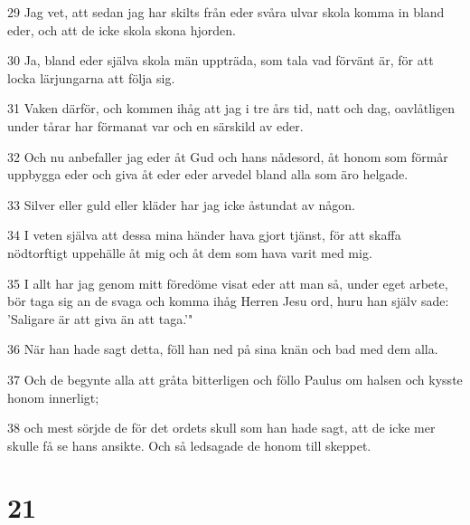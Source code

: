 \par 29 Jag vet, att sedan jag har skilts från eder svåra ulvar skola komma in bland eder, och att de icke skola skona hjorden.
\par 30 Ja, bland eder själva skola män uppträda, som tala vad förvänt är, för att locka lärjungarna att följa sig.
\par 31 Vaken därför, och kommen ihåg att jag i tre års tid, natt och dag, oavlåtligen under tårar har förmanat var och en särskild av eder.
\par 32 Och nu anbefaller jag eder åt Gud och hans nådesord, åt honom som förmår uppbygga eder och giva åt eder eder arvedel bland alla som äro helgade.
\par 33 Silver eller guld eller kläder har jag icke åstundat av någon.
\par 34 I veten själva att dessa mina händer hava gjort tjänst, för att skaffa nödtorftigt uppehälle åt mig och åt dem som hava varit med mig.
\par 35 I allt har jag genom mitt föredöme visat eder att man så, under eget arbete, bör taga sig an de svaga och komma ihåg Herren Jesu ord, huru han själv sade: 'Saligare är att giva än att taga.'"
\par 36 När han hade sagt detta, föll han ned på sina knän och bad med dem alla.
\par 37 Och de begynte alla att gråta bitterligen och föllo Paulus om halsen och kysste honom innerligt;
\par 38 och mest sörjde de för det ordets skull som han hade sagt, att de icke mer skulle få se hans ansikte. Och så ledsagade de honom till skeppet.

\chapter{21}


